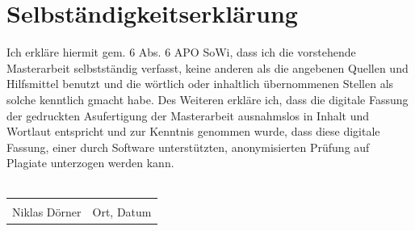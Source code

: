 \documentclass[a4paper, 11 pt, fleqn]{article}
\begin{document}
\section*{Selbständigkeitserklärung}
Ich erkläre hiermit gem. \text{\S}6 Abs. 6 APO SoWi, dass ich die vorstehende Masterarbeit selbstständig verfasst, keine anderen
als die angebenen Quellen und Hilfsmittel benutzt und die wörtlich oder inhaltlich übernommenen Stellen als solche kenntlich
gmacht habe. Des Weiteren erkläre ich, dass die digitale Fassung der gedruckten Asufertigung der Masterarbeit ausnahmslos
in Inhalt und Wortlaut entspricht und zur Kenntnis genommen wurde, dass diese digitale Fassung, einer durch Software
unterstützten, anonymisierten Prüfung auf Plagiate unterzogen werden kann. \\
\vspace*{1 cm}
\\
\noindent\begin{tabular}{ll}
	\makebox[2.5in]{\hrulefill} & \makebox[2.5in]{\hrulefill}\\
	Niklas D\"orner & Ort, Datum\\[8ex]%
\end{tabular}
%
\end{document}
